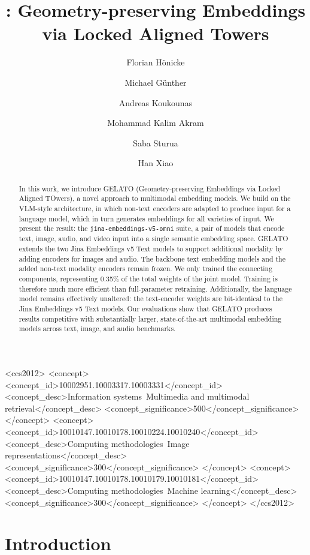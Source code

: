 \documentclass[sigconf]{acmart}
\title{\omniBase{}: Geometry-preserving Embeddings via Locked Aligned Towers}
\author{Florian Hönicke}
\affiliation{\institution{Jina by Elastic}\city{}\country{}}
\author{Michael Günther}
\affiliation{\institution{Jina by Elastic}\city{}\country{}}
\author{Andreas Koukounas}
\affiliation{\institution{Jina by Elastic}\city{}\country{}}
\author{Mohammad Kalim Akram}
\affiliation{\institution{Jina by Elastic}\city{}\country{}}
\author{Saba Sturua}
\affiliation{\institution{Jina by Elastic}\city{}\country{}}
\author{Han Xiao}
\affiliation{\institution{Jina by Elastic}\city{}\country{}}
\newcommand{\omniBase}{\texttt{jina-\allowbreak embeddings-\allowbreak v5-\allowbreak omni}}
\begin{document}
\begin{abstract}
In this work, we introduce GELATO (Geometry-preserving Embeddings via Locked Aligned TOwers), a novel approach to multimodal embedding models.
We build on the VLM-style architecture, in which non-text encoders are adapted to produce input for a language model, which in turn generates embeddings for all varieties of input. 
We present the result: the \omniBase{} suite, a pair of models that encode text, image, audio, and video input into a single semantic embedding space. 
GELATO extends the two Jina Embeddings v5 Text models to support additional modality by adding encoders for images and audio.
The backbone text embedding models and the added non-text modality encoders remain frozen. 
We only trained the connecting components, representing 0.35\% of the total weights of the joint model. 
Training is therefore much more efficient than full-parameter retraining. 
Additionally, the language model remains effectively unaltered: the text-encoder weights are bit-identical to the Jina Embeddings v5 Text models.
Our evaluations show that GELATO produces results competitive with substantially larger, state-of-the-art multimodal embedding models across text, image, and audio benchmarks.
\end{abstract}

\begin{CCSXML}
<ccs2012>
<concept>
<concept_id>10002951.10003317.10003331</concept_id>
<concept_desc>Information systems~Multimedia and multimodal retrieval</concept_desc>
<concept_significance>500</concept_significance>
</concept>
<concept>
<concept_id>10010147.10010178.10010224.10010240</concept_id>
<concept_desc>Computing methodologies~Image representations</concept_desc>
<concept_significance>300</concept_significance>
</concept>
<concept>
<concept_id>10010147.10010178.10010179.10010181</concept_id>
<concept_desc>Computing methodologies~Machine learning</concept_desc>
<concept_significance>300</concept_significance>
</concept>
</ccs2012>
\end{CCSXML}


\maketitle
\pagestyle{plain}

\section{Introduction}
\label{sec:introduction}

\end{document}
